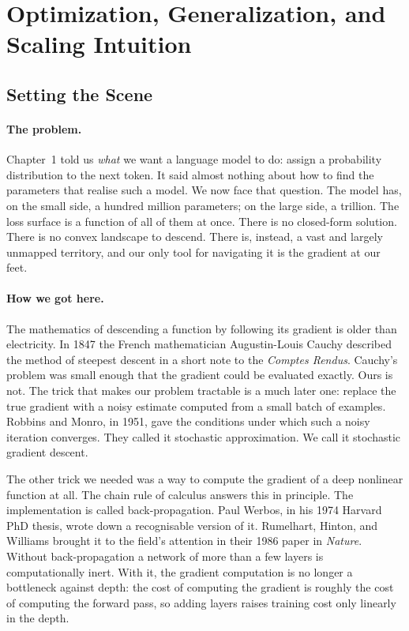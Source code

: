 \section{Optimization, Generalization, and Scaling Intuition}
\label{sec:week2-optgen}

\subsection*{Setting the Scene}

\paragraph{The problem.} Chapter~1 told us \emph{what} we want a
language model to do: assign a probability distribution to the next
token. It said almost nothing about how to find the parameters that
realise such a model. We now face that question. The model has, on
the small side, a hundred million parameters; on the large side, a
trillion. The loss surface is a function of all of them at once.
There is no closed-form solution. There is no convex landscape to
descend. There is, instead, a vast and largely unmapped territory,
and our only tool for navigating it is the gradient at our feet.

\paragraph{How we got here.} The mathematics of descending a
function by following its gradient is older than electricity. In
1847 the French mathematician Augustin-Louis Cauchy described the
method of steepest descent in a short note to the
\emph{Comptes Rendus}. Cauchy's problem was small enough that the
gradient could be evaluated exactly. Ours is not. The trick that
makes our problem tractable is a much later one: replace the true
gradient with a noisy estimate computed from a small batch of
examples. Robbins and Monro, in 1951, gave the conditions under
which such a noisy iteration converges. They called it stochastic
approximation. We call it stochastic gradient descent.

The other trick we needed was a way to compute the gradient of a
deep nonlinear function at all. The chain rule of calculus answers
this in principle. The implementation is called
back-propagation. Paul Werbos, in his 1974 Harvard PhD thesis,
wrote down a recognisable version of it. Rumelhart, Hinton, and
Williams brought it to the field's attention in their 1986 paper
in \emph{Nature}. Without back-propagation a network of more than
a few layers is computationally inert. With it, the gradient
computation is no longer a bottleneck against depth: the cost of
computing the gradient is roughly the cost of computing the forward
pass, so adding layers raises training cost only linearly in the
depth.

